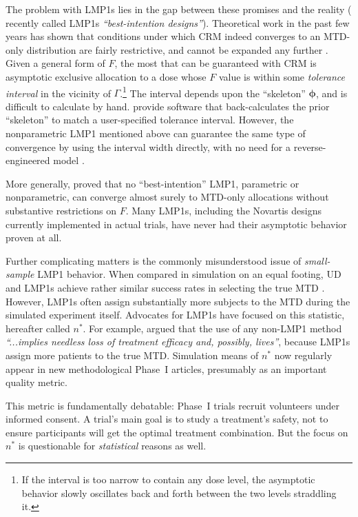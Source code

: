 The problem with LMP1s lies in the gap between these promises and the reality (\cite{Fedo:Flou:Wu:Zhang:Best:2011} recently called LMP1s \emph{``best-intention designs''}). Theoretical work in the past few years has shown that conditions under which CRM indeed converges to an MTD-only distribution are fairly restrictive, and cannot be expanded any further \citep{Azri:anot:2012,Lee:Cheu:interv:calibr:2009,oron:azri:hoff:dose:2011}. Given a general form of $F$, the most that can be guaranteed with CRM is asymptotic exclusive allocation to a dose whose $F$ value is within some \emph{tolerance interval} in the vicinity of $\Gamma$.\footnote{If the interval is too narrow to contain any dose level, the asymptotic behavior slowly oscillates back and forth between the two levels straddling it.} The interval depends upon the ``skeleton'' $\boldsymbol{\phi}$, and is difficult to calculate by hand. \cite{Lee:Cheu:interv:calibr:2009} provide software that back-calculates the prior ``skeleton'' to match a user-specified tolerance interval. However, the nonparametric LMP1 mentioned above can guarantee the same type of convergence by using the interval width directly, with no need for a reverse-engineered model \citep{Ivan:Flou:Chun:Cumu:2007,oron:azri:hoff:dose:2011}. 

More generally, \cite{Azri:etal:imposs:2011} proved that no ``best-intention'' LMP1, parametric or nonparametric, can converge almost surely to MTD-only allocations without substantive restrictions on $F$. Many LMP1s, including the Novartis designs currently implemented in actual trials, have never had their asymptotic behavior proven at all.

Further complicating matters is the commonly misunderstood issue of \emph{small-sample} LMP1 behavior. When compared in simulation on an equal footing, UD and LMP1s achieve rather similar success rates in selecting the true MTD \citep{Oron:Hoff:smal:2013}. However, LMP1s often assign substantially more subjects to the MTD during the simulated experiment itself. Advocates for LMP1s have focused on this statistic, hereafter called $n^*$. For example, \cite{Rogat:etal:oped:2007} argued that the use of any non-LMP1 method \emph{``...implies needless loss of treatment efficacy and, possibly, lives''}, because LMP1s assign more patients to the true MTD. Simulation means of $n^*$ now regularly appear in new methodological Phase~I articles, presumably as an important quality metric.

This metric is fundamentally debatable: Phase~I trials recruit volunteers under informed consent. A trial's main goal is to study a treatment's safety, not to ensure participants will get the optimal treatment combination. But the focus on $n^*$ is questionable for \emph{statistical} reasons as well.

